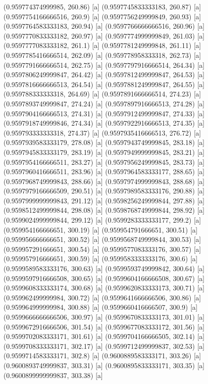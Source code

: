 {{{(0.959774374999985, 260.86) [a] 
(0.9597745833333183, 260.87) [a] 
(0.9597754166666516, 260.9) [a] 
(0.9597756249999849, 260.93) [a] 
(0.9597764583333183, 260.94) [a] 
(0.9597766666666516, 260.96) [a] 
(0.9597770833333182, 260.97) [a] 
(0.9597774999999849, 261.03) [a] 
(0.9597777083333182, 261.1) [a] 
(0.9597781249999848, 261.11) [a] 
(0.9597785416666514, 262.09) [a] 
(0.959778958333318, 262.73) [a] 
(0.9597791666666514, 262.75) [a] 
(0.9597797916666514, 264.34) [a] 
(0.9597806249999847, 264.42) [a] 
(0.9597812499999847, 264.53) [a] 
(0.9597816666666513, 264.54) [a] 
(0.9597881249999847, 264.55) [a] 
(0.959788333333318, 264.69) [a] 
(0.9597891666666514, 274.23) [a] 
(0.9597893749999847, 274.24) [a] 
(0.9597897916666513, 274.28) [a] 
(0.9597904166666513, 274.31) [a] 
(0.9597912499999847, 274.33) [a] 
(0.9597918749999846, 274.34) [a] 
(0.9597922916666513, 274.35) [a] 
(0.959793333333318, 274.37) [a] 
(0.9597935416666513, 276.72) [a] 
(0.9597939583333179, 278.08) [a] 
(0.9597943749999845, 283.18) [a] 
(0.9597945833333179, 283.19) [a] 
(0.9597949999999845, 283.21) [a] 
(0.9597954166666511, 283.27) [a] 
(0.9597956249999845, 283.73) [a] 
(0.9597960416666511, 283.96) [a] 
(0.9597964583333177, 288.65) [a] 
(0.9597968749999843, 288.66) [a] 
(0.9597974999999843, 288.68) [a] 
(0.9597979166666509, 290.51) [a] 
(0.9597989583333176, 290.88) [a] 
(0.9597999999999843, 291.12) [a] 
(0.9598256249999844, 297.88) [a] 
(0.9598512499999844, 298.08) [a] 
(0.9598768749999844, 298.92) [a] 
(0.9599024999999844, 299.12) [a] 
(0.9599283333333177, 299.2) [a] 
(0.959954166666651, 300.19) [a] 
(0.959954791666651, 300.51) [a] 
(0.959956666666651, 300.52) [a] 
(0.9599568749999844, 300.53) [a] 
(0.959957291666651, 300.54) [a] 
(0.9599577083333176, 300.57) [a] 
(0.959957916666651, 300.59) [a] 
(0.9599583333333176, 300.6) [a] 
(0.9599589583333176, 300.63) [a] 
(0.9599593749999842, 300.64) [a] 
(0.9599597916666508, 300.65) [a] 
(0.9599604166666508, 300.67) [a] 
(0.9599608333333174, 300.68) [a] 
(0.9599620833333173, 300.71) [a] 
(0.959962499999984, 300.72) [a] 
(0.9599641666666506, 300.86) [a] 
(0.959964999999984, 300.88) [a] 
(0.9599660416666507, 300.9) [a] 
(0.9599666666666506, 300.97) [a] 
(0.9599670833333173, 301.01) [a] 
(0.9599672916666506, 301.54) [a] 
(0.9599677083333172, 301.56) [a] 
(0.9599702083333171, 301.61) [a] 
(0.9599704166666505, 302.14) [a] 
(0.9599708333333171, 302.17) [a] 
(0.9599712499999837, 302.53) [a] 
(0.9599714583333171, 302.8) [a] 
(0.9600889583333171, 303.26) [a] 
(0.9600893749999837, 303.31) [a] 
(0.9600895833333171, 303.35) [a] 
(0.9600899999999837, 303.38) [a] 
}}}
